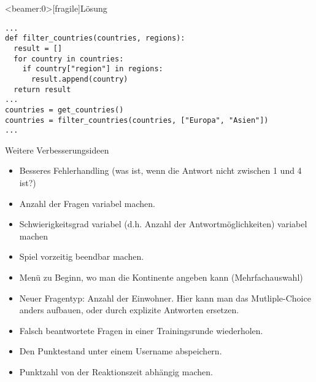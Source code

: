 \begin{frame}<beamer:0>[fragile]{Lösung}
	
\begin{solutionblock}{}
\begin{verbatim}
...
def filter_countries(countries, regions):
  result = []
  for country in countries:
    if country["region"] in regions:
      result.append(country)
  return result
...
countries = get_countries()
countries = filter_countries(countries, ["Europa", "Asien"])
...
\end{verbatim}
\end{solutionblock}
\end{frame}


\begin{frame}
\begin{block}{Weitere Verbesserungsideen}
	\pause 
\begin{itemize}[<+->]
  \item Besseres Fehlerhandling (was ist, wenn die Antwort nicht zwischen 1 und 4 ist?)
  \item Anzahl der Fragen variabel machen. 
  \item Schwierigkeitsgrad variabel (d.h. Anzahl der Antwortmöglichkeiten) variabel machen
  \item Spiel vorzeitig beendbar machen. 
  \item Menü zu Beginn, wo man die Kontinente angeben kann (Mehrfachauswahl)
  \item Neuer Fragentyp: Anzahl der Einwohner. Hier kann man das Mutliple-Choice anders aufbauen, oder durch explizite Antworten ersetzen. 
  \item Falsch beantwortete Fragen in einer Trainingsrunde wiederholen.  
  \item Den Punktestand unter einem Username abspeichern.
  \item Punktzahl von der Reaktionszeit abhängig machen. 
\end{itemize}
\end{block}
\end{frame}